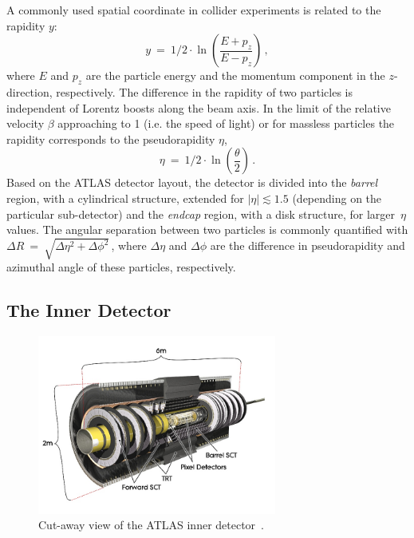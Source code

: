 A commonly used spatial coordinate in  collider experiments  is related to the rapidity $y$:
\begin{equation}
y ~ = ~ 1/2 \cdot \ln \left( \frac{E + p_{z}}{E - p_z} \right) \,, 
\end{equation}
where $E$ and $ p_z$ are the particle energy and the momentum component in the $z$-direction, respectively.
The difference in the rapidity of two particles is independent of Lorentz boosts along the beam axis. 
In the limit of the relative velocity $\beta$ approaching to 1 (i.e. the speed of light)
or for massless particles the rapidity corresponds to the pseudorapidity $\eta$,
\begin{equation}
\eta ~ = ~ 1/2 \cdot \ln \left( \frac{\theta}{2} \right)\,. 
\end{equation}
Based on the ATLAS detector layout, the detector is divided into the \emph{barrel} region, with a cylindrical structure, 
extended for $|\eta| \apprle 1.5$ (depending on the particular  sub-detector) 
and the \emph{endcap} region, with a disk structure, for larger~$\eta$ values. The angular separation between two particles is commonly 
quantified with $\Delta R ~=~\sqrt{\Delta \eta^2 + \Delta \phi^2}\,$, where $\Delta\eta$ and $\Delta\phi$ are the difference in pseudorapidity
and azimuthal angle of these particles, respectively.

\subsection{The Inner Detector}

\begin{figure}[tp]
     \begin{center}

            \includegraphics[width=0.7\textwidth]{figure/Inner_detector.jpg}

    \end{center}
    \caption{Cut-away view of the ATLAS inner detector~\cite{ATLASDetector}.}

   \label{fig:atlasID}
\end{figure}


